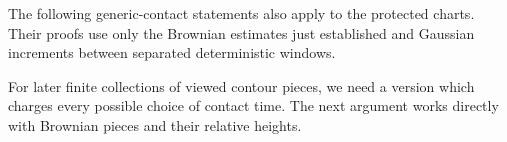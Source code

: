The following generic-contact statements also apply to the protected
charts.  Their proofs use only the Brownian estimates just established
and Gaussian increments between separated deterministic windows.



For later finite collections of viewed contour pieces, we need a version
which charges every possible choice of contact time.  The next argument
works directly with Brownian pieces and their relative heights.



